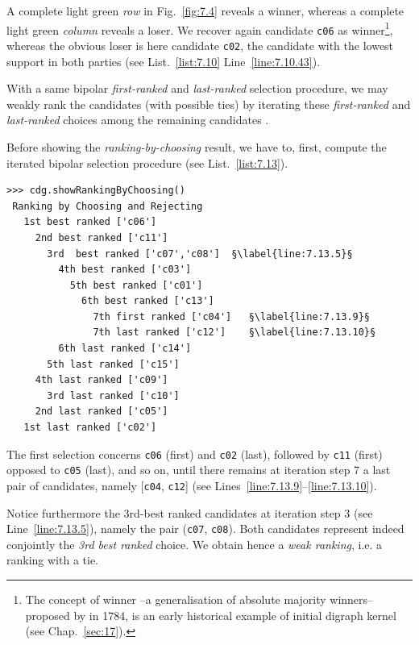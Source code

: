 A complete light green \emph{row} in Fig.~\vref{fig:7.4} reveals a \Condorcet winner, whereas a complete light green \emph{column} reveals a \Condorcet loser. We recover again candidate \texttt{c06} as \Condorcet winner\footnote{The concept of \Condorcet winner --a generalisation of absolute majority winners-- proposed by \Condorcet in 1784, is an early historical example of initial digraph kernel (see Chap.~\ref{sec:17}).}, whereas the obvious \Condorcet loser is here candidate \texttt{c02}, the candidate with the lowest support in both parties (see List.~\vref{list:7.10} Line~\ref{line:7.10.43}).

With a same bipolar \emph{first-ranked} and \emph{last-ranked} selection procedure, we may weakly rank the candidates (with possible ties) by iterating these \emph{first-ranked} and \emph{last-ranked} choices among the remaining candidates \citep{BIS-1999}.

Before showing the \emph{ranking-by-choosing} result, we have to, first, compute the iterated bipolar selection procedure (see List.~\vref{list:7.13}).
\begin{lstlisting}[caption={Ranking by iterating choosing the \emph{first} and \emph{last} remaining candidates },label=list:7.13]
>>> cdg.showRankingByChoosing()
 Ranking by Choosing and Rejecting
   1st best ranked ['c06']
     2nd best ranked ['c11']
       3rd  best ranked ['c07','c08']  §\label{line:7.13.5}§
         4th best ranked ['c03']
           5th best ranked ['c01']
             6th best ranked ['c13']
               7th first ranked ['c04']   §\label{line:7.13.9}§ 
               7th last ranked ['c12']    §\label{line:7.13.10}§ 
	     6th last ranked ['c14']
	   5th last ranked ['c15']
	 4th last ranked ['c09']
       3rd last ranked ['c10']
     2nd last ranked ['c05']
   1st last ranked ['c02']
\end{lstlisting}

The first selection concerns \texttt{c06} (first) and \texttt{c02} (last), followed by \texttt{c11} (first) opposed to \texttt{c05} (last), and so on, until there remains at iteration step 7 a last pair of candidates, namely [\texttt{c04}, \texttt{c12}] (see Lines~\ref{line:7.13.9}--\ref{line:7.13.10}).

Notice furthermore the 3rd-best ranked candidates at iteration step 3 (see Line~\ref{line:7.13.5}), namely the pair (\texttt{c07}, \texttt{c08}). Both candidates represent indeed conjointly the \emph{3rd best ranked} choice. We obtain hence a \emph{weak ranking}, i.e. a ranking with a tie.

